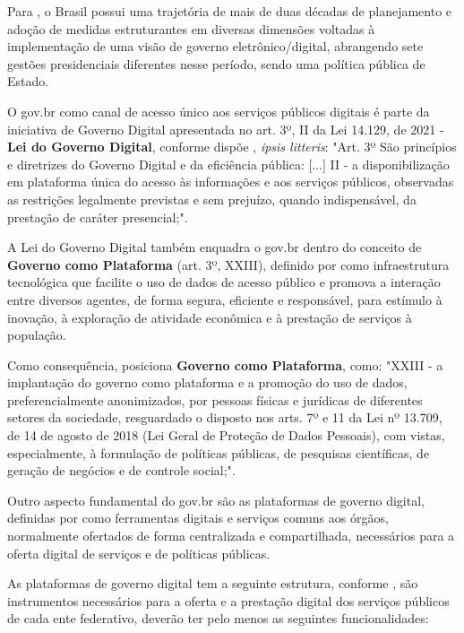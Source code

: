 Para \cite{mitkiewicz2024transformaccao}, o Brasil possui uma trajetória de mais de duas décadas de planejamento e adoção de medidas estruturantes em diversas dimensões voltadas à implementação de uma visão de governo eletrônico/digital, abrangendo sete gestões presidenciais diferentes nesse período, sendo uma política pública de Estado.

O gov.br como canal de acesso único aos serviços públicos digitais é parte da iniciativa de Governo Digital apresentada no art. 3º, II da Lei 14.129, de 2021 - \textbf{Lei do Governo Digital}, conforme dispõe \cite{l14129}, \textit{ipsis litteris}: "Art. 3º  São princípios e diretrizes do Governo Digital e da eficiência pública: [...] II - a disponibilização em plataforma única do acesso às informações e aos serviços públicos, observadas as restrições legalmente previstas e sem prejuízo, quando indispensável, da prestação de caráter presencial;".

A Lei do Governo Digital também enquadra o gov.br dentro do conceito de \textbf{Governo como Plataforma} (art. 3º, XXIII), definido por \cite{l14129} como infraestrutura tecnológica que facilite o uso de dados de acesso público e promova a interação entre diversos agentes, de forma segura, eficiente e responsável, para estímulo à inovação, à exploração de atividade econômica e à prestação de serviços à população.

Como consequência, \cite{l14129} posiciona \textbf{Governo como Plataforma}, como: "XXIII - a implantação do governo como plataforma e a promoção do uso de dados, preferencialmente anonimizados, por pessoas físicas e jurídicas de diferentes setores da sociedade, resguardado o disposto nos arts. 7º e 11 da Lei nº 13.709, de 14 de agosto de 2018 (Lei Geral de Proteção de Dados Pessoais), com vistas, especialmente, à formulação de políticas públicas, de pesquisas científicas, de geração de negócios e de controle social;".

Outro aspecto fundamental do gov.br são as plataformas de governo digital, definidas por \cite{l14129} como ferramentas digitais e serviços comuns aos órgãos, normalmente ofertados de forma centralizada e compartilhada, necessários para a oferta digital de serviços e de políticas públicas. 

As plataformas de governo digital tem a seguinte estrutura, conforme \cite{l14129}, são instrumentos necessários para a oferta e a prestação digital dos serviços públicos de cada ente federativo, deverão ter pelo menos as seguintes funcionalidades: 

